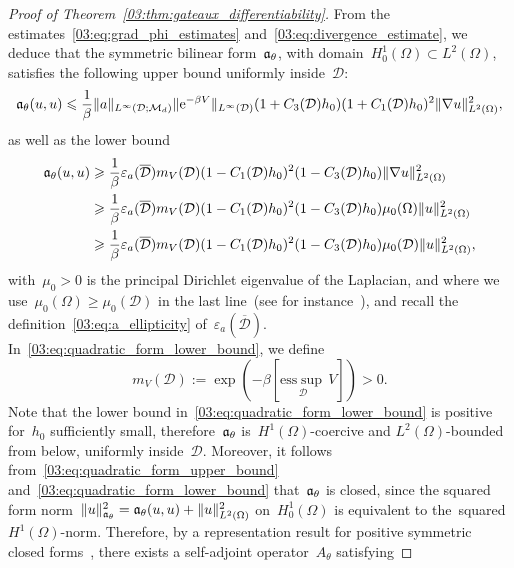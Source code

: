 \begin{proof}[Proof of Theorem~\ref{03:thm:gateaux_differentiability}]
    From the estimates~\eqref{03:eq:grad_phi_estimates} and~\eqref{03:eq:divergence_estimate}, we deduce that the symmetric bilinear form~$\mathfrak{a}_\theta$, with domain~$H_0^1(\Omega)\subset L^2(\Omega)$, satisfies the following upper bound uniformly inside~$\mathcal D$:
    \begin{equation}
        \label{03:eq:quadratic_form_upper_bound}
        \mathfrak{a}_\theta(u,u) \leqslant \frac1\beta\|a\|_{L^\infty\left(\mathcal D;\mathcal M_d\right)}\|\mathrm{e}^{-\beta V}\|_{L^\infty\left(\mathcal D\right)}(1+C_3(\mathcal D) h_0)(1+C_1(\mathcal D)h_0)^2\|\nabla u\|^2_{L^2(\Omega)},
    \end{equation}
     as well as the lower bound
    \begin{equation}
        \label{03:eq:quadratic_form_lower_bound}
        \begin{aligned}
            \mathfrak{a}_\theta(u,u) &\geqslant \frac1\beta\varepsilon_a(\overline{\mathcal D}) m_V(\mathcal D) (1-C_1(\mathcal D)h_0)^2(1-C_3(\mathcal D)h_0)\|\nabla u\|_{L^2(\Omega)}^2\\
            &\geqslant \frac1\beta\varepsilon_a(\overline{\mathcal D}) m_V(\mathcal D) (1-C_1(\mathcal D)h_0)^2(1-C_3(\mathcal D)h_0) \mu_0(\Omega)\|u\|^2_{L^2(\Omega)}\\
            &\geqslant \frac1\beta\varepsilon_a(\overline{\mathcal D}) m_V(\mathcal D) (1-C_1(\mathcal D)h_0)^2(1-C_3(\mathcal D)h_0) \mu_0(\mathcal D)\|u\|^2_{L^2(\Omega)},
        \end{aligned}
    \end{equation}
    with~$\mu_0>0$ is the principal Dirichlet eigenvalue of the Laplacian, and where we use~$\mu_0(\Omega)\geq \mu_0(\mathcal D)$ in the last line~(see for instance~\cite[Proposition 16]{BLS25a}), and recall the definition~\eqref{03:eq:a_ellipticity} of~$\varepsilon_a(\overline{\mathcal D})$.
    In~\eqref{03:eq:quadratic_form_lower_bound}, we define
    $$ m_V(\mathcal D) := \exp\left(-\beta \left[\underset{\mathcal D}{\mathrm{ess}\sup}\, V\right]\right)>0.$$
    Note that the lower bound in~\eqref{03:eq:quadratic_form_lower_bound} is positive for~$h_0$ sufficiently small, therefore~$\mathfrak{a}_{\theta}$ is~$H^1(\Omega)$-coercive and $L^2(\Omega)$-bounded from below, uniformly inside~$\mathcal D$.
    Moreover, it follows from~\eqref{03:eq:quadratic_form_upper_bound} and~\eqref{03:eq:quadratic_form_lower_bound} that~$\mathfrak{a}_\theta$ is closed, since the squared form norm~$\|u\|_{\mathfrak{a}_\theta}^2 = \mathfrak{a}_\theta(u,u) + \|u\|^2_{L^2(\Omega)}$ on~$H_0^1(\Omega)$ is equivalent to the~squared $H^1(\Omega)$-norm.
    Therefore, by a representation result for positive symmetric closed forms~\cite[Theorem VI.2.6]{K95}, there exists a self-adjoint operator~$A_\theta$ satisfying

\end{proof}
